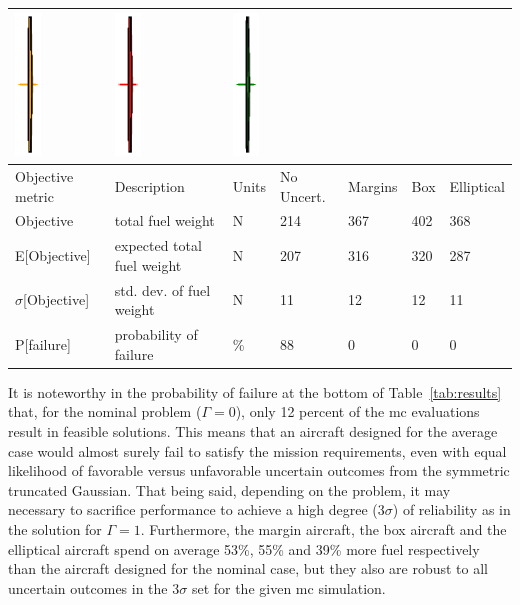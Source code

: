 \begin{table}[!h]
\begin{center}
\begin{tabular}{C{2cm} C{3.8cm} C{1.25cm} C{1.6cm} C{1.6cm} C{1.6cm} C{1.6cm}}
    \includegraphics[trim={10.5cm 1.5cm 10.5cm 1.5cm},clip,height=3.8cm]{margins.eps} &
    \includegraphics[trim={10.5cm 1.5cm 10.5cm 1.5cm},clip,height=3.8cm]{box.eps} &
    \includegraphics[trim={10.5cm 1.5cm 10.5cm 1.5cm},clip,height=3.8cm]{elliptical.eps} \\
\hline
Objective metric & Description & Units & No Uncert. & Margins & Box & Elliptical \\
\hline
Objective & total fuel weight & $\mathrm{N}$ & 214 & 367 & 402 & 368 \\
E[Objective] & expected total fuel weight & $\mathrm{N}$ & 207 & 316 & 320 & 287 \\
$\sigma$[Objective] & std. dev. of fuel weight & $\mathrm{N}$ & 11 & 12 & 12 & 11 \\
P[failure] & probability of failure & \% & 88 & 0 & 0 & 0\\
\hline
\end{tabular}
\end{center}
\end{table}

It is noteworthy in the probability of failure at the bottom of Table~\ref{tab:results} that,
for the nominal problem ($\Gamma = 0$),
only 12 percent of the \gls{mc} evaluations result in feasible solutions.
This means that an aircraft designed for the average case would almost surely
fail to satisfy the mission requirements, even with equal likelihood of favorable versus
unfavorable uncertain outcomes from the symmetric truncated Gaussian.
That being said, depending on the problem, it may necessary to sacrifice
performance to achieve a high degree ($3\sigma$) of
reliability as in the solution for $\Gamma = 1$. Furthermore, the margin aircraft, the box aircraft
and the elliptical aircraft spend on average 53\%, 55\% and 39\% more fuel respectively
than the aircraft designed for the nominal case, but they also are
robust to all uncertain outcomes in the $3\sigma$ set for the given \gls{mc} simulation.

